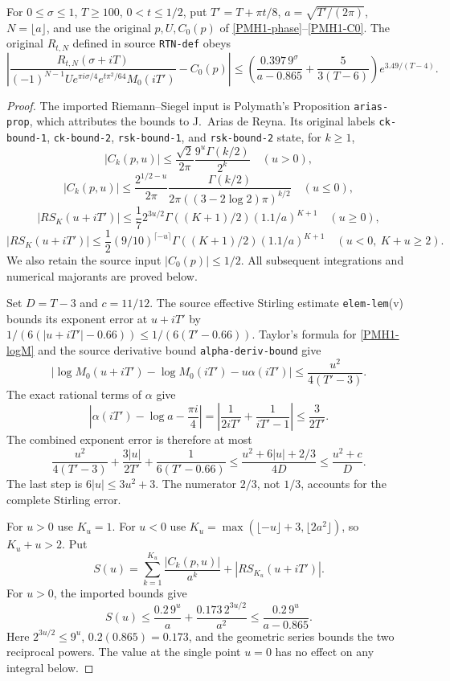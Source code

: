 \begin{theorem}
\label{PMH11}
For $0\le\sigma\le1$, $T\ge100$, $0<t\le1/2$, put
$T'=T+\pi t/8$, $a=\sqrt{T'/(2\pi)}$, $N=\lfloor a\rfloor$,
and use the original $p,U,C_0(p)$ of
\eqref{PMH1-phase}--\eqref{PMH1-C0}. The original $R_{t,N}$
defined in source \texttt{RTN-def} obeys
\begin{equation}\label{PMH11-final}
 \left|\frac{R_{t,N}(\sigma+iT)}
 {(-1)^{N-1}Ue^{\pi i\sigma/4}e^{t\pi^2/64}M_0(iT')}-C_0(p)\right|
 \le\left(\frac{0.397\,9^\sigma}{a-0.865}
               +\frac5{3(T-6)}\right)e^{3.49/(T-4)}.
\end{equation}
\end{theorem}
\begin{proof}
The imported Riemann--Siegel input is Polymath's Proposition
\texttt{arias-prop}, which attributes the bounds to J.~Arias de
Reyna. Its original labels \texttt{ck-bound-1},
\texttt{ck-bound-2}, \texttt{rsk-bound-1}, and
\texttt{rsk-bound-2} state, for $k\ge1$,
\[
 |C_k(p,u)|\le\frac{\sqrt2}{2\pi}
       \frac{9^u\Gamma(k/2)}{2^k}\quad(u>0),
\]
\[
 |C_k(p,u)|\le\frac{2^{1/2-u}}{2\pi}
       \frac{\Gamma(k/2)}{2\pi((3-2\log2)\pi)^{k/2}}
       \quad(u\le0),
\]
\[
 |RS_K(u+iT')|\le\frac17 2^{3u/2}\Gamma((K+1)/2)(1.1/a)^{K+1}
       \quad(u\ge0),
\]
\[
 |RS_K(u+iT')|\le\frac12(9/10)^{\lceil-u\rceil}
       \Gamma((K+1)/2)(1.1/a)^{K+1}
       \quad(u<0,\ K+u\ge2).
\]
We also retain the source input $|C_0(p)|\le1/2$. All subsequent
integrations and numerical majorants are proved below.

Set $D=T-3$ and $c=11/12$. The source effective Stirling estimate
\texttt{elem-lem}(v) bounds its exponent error at $u+iT'$ by
$1/(6(|u+iT'|-0.66))\le1/(6(T'-0.66))$.
Taylor's formula for \eqref{PMH1-logM} and the source derivative
bound \texttt{alpha-deriv-bound} give
\[
 |\log M_0(u+iT')-\log M_0(iT')-u\alpha(iT')|
 \le\frac{u^2}{4(T'-3)}.
\]
The exact rational terms of $\alpha$ give
\[
 \left|\alpha(iT')-\log a-\frac{\pi i}{4}\right|
 =\left|\frac1{2iT'}+\frac1{iT'-1}\right|\le\frac3{2T'}.
\]
The combined exponent error is therefore at most
\begin{equation}\label{PMH11-pointwise}
 \frac{u^2}{4(T'-3)}+\frac{3|u|}{2T'}+\frac1{6(T'-0.66)}
 \le\frac{u^2+6|u|+2/3}{4D}
 \le\frac{u^2+c}{D}.
\end{equation}
The last step is $6|u|\le3u^2+3$. The numerator $2/3$, not
$1/3$, accounts for the complete Stirling error.

For $u>0$ use $K_u=1$. For $u<0$ use
$K_u=\max(\lfloor-u\rfloor+3,\lfloor2a^2\rfloor)$, so
$K_u+u>2$. Put
\[
 S(u)=\sum_{k=1}^{K_u}\frac{|C_k(p,u)|}{a^k}
            +|RS_{K_u}(u+iT')|.
\]
For $u>0$, the imported bounds give
\[
 S(u)\le\frac{0.2\,9^u}{a}+\frac{0.173\,2^{3u/2}}{a^2}
 \le\frac{0.2\,9^u}{a-0.865}.
\]
Here $2^{3u/2}\le9^u$, $0.2(0.865)=0.173$, and the geometric
series bounds the two reciprocal powers. The value at the single
point $u=0$ has no effect on any integral below.


\end{proof}
